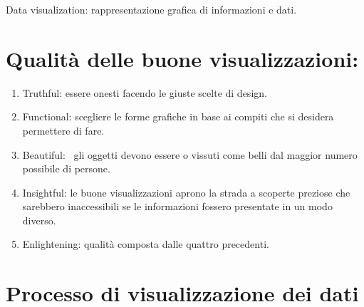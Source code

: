 \documentclass[
]{article}
\providecommand{\tightlist}{%
  \setlength{\itemsep}{0pt}\setlength{\parskip}{0pt}}
\begin{document}
{}

{Data visualization}{: rappresentazione grafica di informazioni e dati.}

{}

\section{\texorpdfstring{{Qualità delle buone
visualizzazioni}{:}}{Qualità delle buone visualizzazioni:}}\label{h.3il1p9ix1qdp}

\begin{enumerate}
\tightlist
\item
  {Truthful}{: }{essere onesti facendo le giuste scelte di design.}
\end{enumerate}

{}

\begin{enumerate}
\setcounter{enumi}{1}
\tightlist
\item
  {Functional}{: }{scegliere le forme grafiche in base ai compiti che si
  desidera permettere di fare.}
\end{enumerate}

{}

\begin{enumerate}
\setcounter{enumi}{2}
\tightlist
\item
  {Beautiful}{: ~gli oggetti devono essere o vissuti come belli dal
  maggior numero possibile di persone.}
\end{enumerate}

{}

\begin{enumerate}
\setcounter{enumi}{3}
\tightlist
\item
  {Insightful}{: le buone visualizzazioni aprono la strada a scoperte
  preziose che sarebbero inaccessibili se le informazioni fossero
  presentate in un modo diverso. }
\end{enumerate}

{}

\begin{enumerate}
\setcounter{enumi}{4}
\tightlist
\item
  {Enlightening}{: qualità composta dalle quattro precedenti.}
\end{enumerate}

{}

\section{\texorpdfstring{{Processo di visualizzazione dei
dati}}{Processo di visualizzazione dei dati}}\label{h.4hks72tugq8f}
\end{document}
